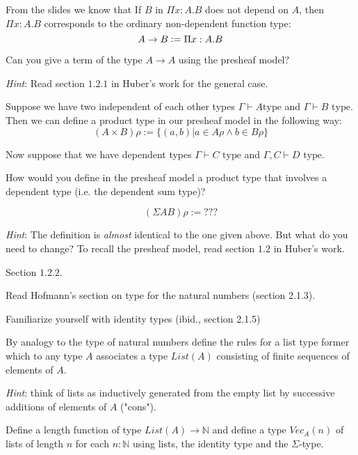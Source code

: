 \begin{exercise}
  From the slides we know that If $B$ in $\Pi x: A. B$ does not depend on $A$,
  then $\Pi x: A. B$ corresponds to the ordinary non-dependent function type:
  \begin{equation*}
    A \to B \vcentcolon= \Pi x: A. B
  \end{equation*}

  Can you give a term of the type $A \to A$ using the presheaf model?

  \emph{Hint}: Read section $1.2.1$ in Huber's work for the general case.

\end{exercise}

\begin{exercise}
  Suppose we have two independent of each other types $\Gamma \vdash A \text{
  type}$ and $\Gamma \vdash B \text{ type}$.
  Then we can define a product type in our presheaf model in the following way:
  \[
    (A \times B)\rho := \{(a,b) | a \in A\rho \land b \in B\rho\}
  \]

  Now suppose that we have dependent types $\Gamma \vdash C \text{ type}$ and
  $\Gamma, C \vdash D \text{ type}$.

  How would you define in the presheaf model a product type that involves a
  dependent type (i.e. the dependent sum type)?

  \[
    (\Sigma AB)\rho := ???
  \]

  \emph{Hint}: The definition is \emph{almost} identical to the one given
  above. But what do you need to change? To recall the presheaf model, read
  section $1.2$ in Huber's work.
\end{exercise}
\begin{answer}
  Section $1.2.2$.
\end{answer}

\begin{exercise}
  Read Hofmann's section on type for the natural numbers (section 2.1.3).

  Familiarize yourself with identity types (ibid., section 2.1.5)

  By analogy to the type of natural numbers define the rules for a list type
  former which to any type $A$ associates a type $List(A)$ consisting of finite
  sequences of elements of $A$.

  \emph{Hint}: think of lists as inductively
  generated from the empty list by successive additions of elements of $A$
  ("cons").

  Define a length function of type $List(A) \to \mathbb{N}$ and
  define a type $\mathit{Vec_A}(n)$ of lists of length $n$ for each $n : \mathbb{N}$
  using lists, the identity type and the $\Sigma$-type.
\end{exercise}

